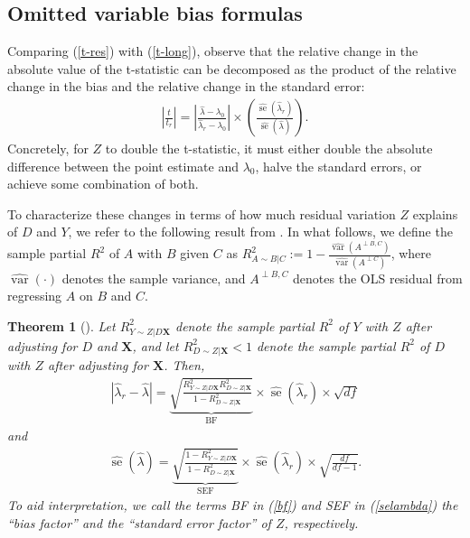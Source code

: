\documentclass[sts]{imsart}
\theoremstyle{plain}
\newtheorem{theorem}{Theorem}
\theoremstyle{definition}
\DeclareMathOperator{\var}{\text{var}}
\newcommand{\df}{df}
\DeclareMathOperator{\se}{\text{se}}
\newcommand{\Ry}{R^2_{Y\sim Z | D\mathbf{X}}}
\newcommand{\Rd}{R^2_{D\sim Z | \mathbf{X}}}
\begin{document}
\subsection{Omitted variable bias formulas}

Comparing (\ref{t-res}) with (\ref{t-long}),
observe that the relative change in the absolute value of the
t-statistic can be decomposed as the product of the relative change 
in the bias
and the relative change in the standard error:
%
\begin{align}
\left|\frac{t}{t_r}\right|= \left|\frac{\hat{\lambda} - \lambda_0}{\hat{\lambda}_r-\lambda_0} \right| \times \left(\frac{{\widehat{\se}(\hat{\lambda}_r)}}{\widehat{\se}(\hat{\lambda})}\right). \label{eq:t.tr}
\end{align}
%
Concretely, for $Z$ to double the t-statistic, it must either double the absolute difference between the point estimate and $\lambda_0$, halve the standard errors, or achieve some combination of both.

To characterize these changes in terms of how much residual variation $Z$ explains of $D$ and $Y$, we refer to the following result from \cite{cinelli_making_2020}. In what follows, we define the sample partial $R^2$ of $A$ with $B$ given $C$ as  $R^2_{A\sim B|C} := 1 - \frac{\widehat{\var}(A^{\perp B,C})}{\widehat{\var}(A^{\perp C})}$, where $\widehat{\var}(\cdot)$ denotes the sample variance, and $A^{\perp B,C}$ denotes the OLS residual from regressing $A$ on $B$ and $C$.
%
\begin{theorem}[\citealp{cinelli_making_2020}]
\label{thm:ovb}
    Let $\Ry$ denote the sample partial $R^2$ of $Y$ with $Z$ after adjusting for $D$ and $\mathbf{X}$, and let $\Rd < 1$ denote the sample partial $R^2$ of $D$ with $Z$ after adjusting for $\mathbf{X}$. Then,
\begin{align}
    |\hat{\lambda}_{r } - \hat{\lambda}| = \underbrace{\sqrt{ \frac{\Ry\Rd}{1-\Rd}}}_{\textrm{BF}} \times \widehat{\se}(\hat{\lambda}_{r }) \times \sqrt{\df} \label{bf}
\end{align}
and 
\begin{align}
    \widehat{\se}(\hat{\lambda}) 
    = \underbrace{\sqrt{\frac{1-\Ry}{1-\Rd}}}_{\textrm{SEF}}  \times \widehat{\se}(\hat{\lambda}_{r }) \times\sqrt{\frac{\df}{\df-1}}. \label{selambda}
\end{align}
To aid interpretation, we call the terms BF in (\ref{bf}) and SEF in (\ref{selambda}) the ``bias factor'' and the ``standard error factor'' of $Z$, respectively. 
\label{ovb}
\end{theorem}
\end{document}
